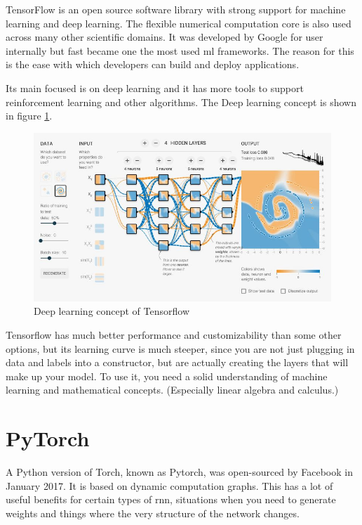 \documentclass[thesis=M,english]{FITthesis}[2012/06/26]
\begin{document}
TensorFlow\cite{ml_tensorflow} is an open source software library with strong support for machine learning and deep learning. The flexible numerical computation core is also used across many other scientific domains. It was developed by Google for user internally but fast became one the most used \acrshort{ml} frameworks. The reason for this is the ease with which developers can build and deploy applications.

Its main focused is on deep learning and it has more tools to support reinforcement learning and other algorithms. The Deep learning concept is shown in figure \ref{fig:ml_tensorflow_dl}.

\begin{figure}[h!]\centering
	\includegraphics[width=1\textwidth]{pictures/ml_tensorflow_dl}
	\caption{Deep learning concept of Tensorflow \cite{ml_tensorflow_dl}}\label{fig:ml_tensorflow_dl}
\end{figure}

Tensorflow has much better performance and customizability than some other options, but its learning curve is much steeper, since you are not just plugging in data and labels into a constructor, but are actually creating the layers that will make up your model. To use it, you need a solid understanding of machine learning and mathematical concepts. (Especially linear algebra and calculus.)
\pagebreak

\section{PyTorch}

A Python version of Torch, known as Pytorch, was open-sourced by Facebook in January 2017. It is based on dynamic computation graphs. This has a lot of useful benefits for certain types of \acrshort{rnn}, situations when you need to generate weights and things where the very structure of the network changes.\\
\end{document}

